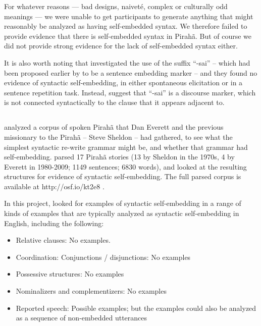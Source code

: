 \documentclass{article}
\begin{document}
For whatever reasons — bad designs, naiveté, complex or culturally odd meanings — we were unable to get participants to generate anything that might reasonably be analyzed as having self-embedded syntax. We therefore failed to provide evidence that there is self-embedded syntax in Pirahã.  But of course we did not provide strong evidence for the lack of self-embedded syntax either.

It is also worth noting that \cite{sakel2010piraha} investigated the use of the suffix ``-sai'' -- which had been proposed earlier by \cite{everett1986piraha} to be a sentence embedding marker -- and they found no evidence of syntactic self-embedding, in either spontaneous elicitation or in a sentence repetition task. Instead, \cite{sakel2010piraha} suggest that ``-sai'' is a discourse marker, which is not connected syntactically to the clause that it appears adjacent to.

\subsection{\cite{futrell2016corpus}}

\cite{futrell2016corpus} analyzed a corpus of spoken Pirahã that Dan Everett and the previous missionary to the Pirahã -- Steve Sheldon -- had gathered, to see what the simplest syntactic re-write grammar might be, and whether that grammar had self-embedding. \cite{futrell2016corpus} parsed 17 Pirahã stories (13 by Sheldon in the 1970s, 4 by Everett in 1980-2009; 1149 sentences; 6830 words), and looked at the resulting structures for evidence of syntactic self-embedding. The full parsed corpus is available at http://osf.io/kt2e8 .

In this project, \cite{futrell2016corpus} looked for examples of syntactic self-embedding in a range of kinds of examples that are typically analyzed as syntactic self-embedding in English, including the following:

\begin{itemize}
    \item Relative clauses: No examples.
    \item Coordination: Conjunctions / disjunctions: No examples 
    \item Possessive structures: No examples
    \item Nominalizers and complementizers: No examples
    \item Reported speech: Possible examples; but the examples could also be analyzed as a sequence of non-embedded utterances
\end{itemize} 
\end{document}
